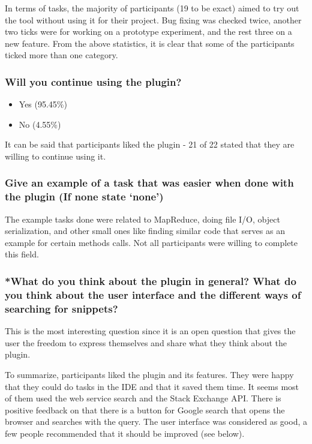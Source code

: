 \documentclass{l4proj}
\begin{document}
\noindent
In terms of tasks, the majority of participants (19 to be exact) aimed to try out the tool without using it for their project. Bug fixing was checked twice, another two ticks were for working on a prototype experiment, and the rest three on a new feature. From the above statistics, it is clear that some of the participants ticked more than one category. 

\subsubsection{Will you continue using the plugin?}
\begin{itemize}
\item Yes (95.45\%)
\item No (4.55\%)
\end{itemize}

It can be said that participants liked the plugin - 21 of 22 stated that they are willing to continue using it.

\subsubsection{Give an example of a task that was easier when done with the plugin (If none state ‘none’)}

The example tasks done were related to MapReduce, doing file I/O, object serialization, and other small ones like finding similar code that serves as an example for certain methods calls. Not all participants were willing to complete this field.

\subsubsection{*What do you think about the plugin in general? What do you think about the user interface and the different ways of searching for snippets?}

This is the most interesting question since it is an open question that gives the user the freedom to express themselves and share what they think about the plugin. 

\noindent
To summarize, participants liked the plugin and its features. They were happy that they could do tasks in the IDE and that it saved them time. It seems most of them used the web service search and the Stack Exchange API. There is positive feedback on that there is a button for Google search that opens the browser and searches with the query. The user interface was considered as good, a few people recommended that it should be improved (see below).
\end{document}
